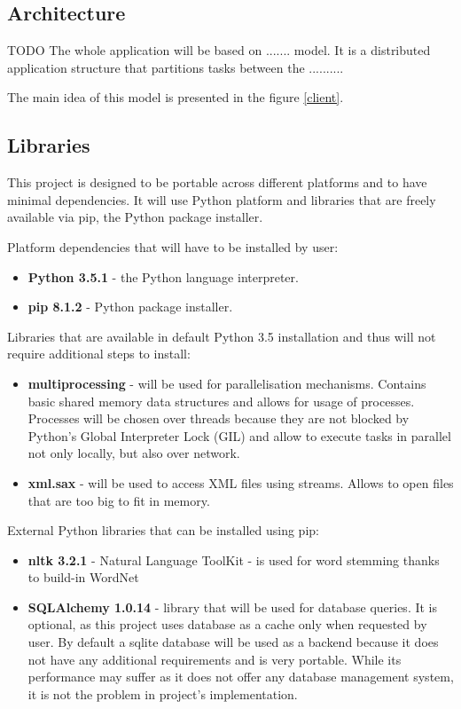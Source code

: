  
  

\subsection{Architecture}
TODO
The whole application will be based on ....... model. It is a distributed application structure that partitions tasks between the ..........


The main idea of this model is presented in the figure \ref{client}.
 
 
 
 
\subsection{Libraries} \label{design-libraries}
This project is designed to be portable across different platforms and to have minimal dependencies. It will use Python platform and libraries that are freely available via pip, the Python package installer.

Platform dependencies that will have to be installed by user:
\begin{itemize}
	\item \textbf{Python 3.5.1} - the Python language interpreter.
	\item\textbf{pip 8.1.2} - Python package installer.
\end{itemize}

Libraries that are available in default Python 3.5 installation and thus will not require additional steps to install:
\begin{itemize}
	\item \textbf{multiprocessing} - will be used for parallelisation mechanisms. Contains basic shared memory data structures and allows for usage of processes. Processes will be chosen over threads because they are not blocked by Python's Global Interpreter Lock (GIL) and allow to execute tasks in parallel not only locally, but also over network.
	\item \textbf{xml.sax} - will be used to access XML files using streams. Allows to open files that are too big to fit in memory.
\end{itemize}

External Python libraries that can be installed using pip:
\begin{itemize}
	\item \textbf{nltk 3.2.1} - Natural Language ToolKit - is used for word stemming thanks to build-in WordNet
	\item \textbf{SQLAlchemy 1.0.14} - library that will be used for database queries. It is optional, as this project uses database as a cache only when requested by user. By default a sqlite database will be used as a backend because it does not have any additional requirements and is very portable. While its performance may suffer as it does not offer any database management system, it is not the problem in project's implementation.
\end{itemize}


